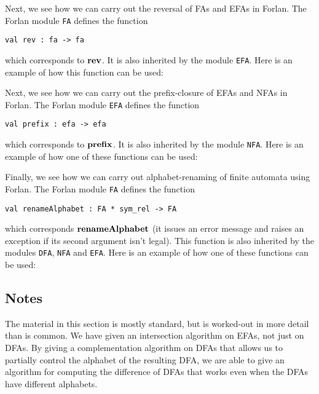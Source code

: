 Next, we see how we can carry out the reversal of FAs and EFAs in
Forlan.  The Forlan module \texttt{FA} defines the function
\begin{verbatim}
val rev : fa -> fa
\end{verbatim}
%
which corresponds to $\mathbf{rev}$.
It is also inherited by the module \texttt{EFA}.
%
Here is an example of how this function can be used:


Next, we see how we can carry out the prefix-closure of EFAs and NFAs in
Forlan.  The Forlan module \texttt{EFA} defines the function
\begin{verbatim}
val prefix : efa -> efa
\end{verbatim}
%
which corresponds to $\mathbf{prefix}$.
It is also inherited by the module \texttt{NFA}.
%
Here is an example of how one of these functions can be used:


Finally, we see how we can carry out alphabet-renaming of finite
automata using Forlan.
The Forlan module \texttt{FA} defines the function
\begin{verbatim}
val renameAlphabet : FA * sym_rel -> FA
\end{verbatim}
%
which corresponds $\mathbf{renameAlphabet}$ (it issues an error message and
raises an exception if its second argument isn't legal).
This function is also inherited by the modules \texttt{DFA},
\texttt{NFA} and \texttt{EFA}.
%
%
Here is an example of how one of these functions can be used:


\subsection{Notes}

The material in this section is mostly standard, but is worked-out in
more detail than is common.  We have given an intersection algorithm
on EFAs, not just on DFAs.  By giving a complementation algorithm on
DFAs that allows us to partially control the alphabet of the resulting
DFA, we are able to give an algorithm for computing the difference of
DFAs that works even when the DFAs have different alphabets.

%

